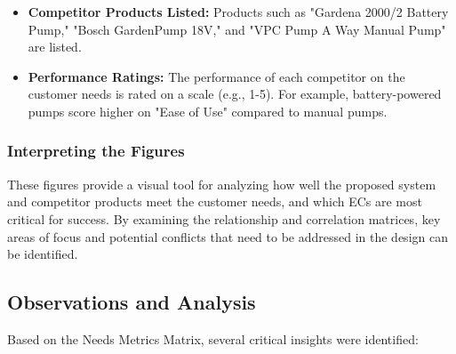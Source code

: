 \documentclass[12pt]{report}
\begin{document}
\begin{itemize}
    \item \textbf{Competitor Products Listed:} Products such as "Gardena 2000/2 Battery Pump," "Bosch GardenPump 18V," and "VPC Pump A Way Manual Pump" are listed.

    \item \textbf{Performance Ratings:} The performance of each competitor on the customer needs is rated on a scale (e.g., 1-5). For example, battery-powered pumps score higher on "Ease of Use" compared to manual pumps.

\end{itemize}

\subsubsection{Interpreting the Figures}

These figures provide a visual tool for analyzing how well the proposed system and competitor products meet the customer needs, and which ECs are most critical for success. By examining the relationship and correlation matrices, key areas of focus and potential conflicts that need to be addressed in the design can be identified.

\subsection{Observations and Analysis}

Based on the Needs Metrics Matrix, several critical insights were identified:
\end{document}
